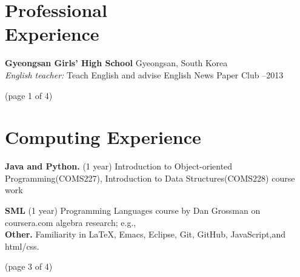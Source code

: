 \documentclass[margin,line]{resume}
\begin{document}
\begin{resume}
    
    \section{\mysidestyle Professional\\Experience}
    \textbf{Gyeongsan Girls' High School} \hfill \nosmall Gyeongsan, South Korea \\
    \textsl{English teacher:} \nosmall Teach English and advise English News Paper Club  \hfill {}--2013 \\
    


\vspace{-1cm}

\begin{center}
\hfill (page 1 of 4)
\end{center}
\newpage

    \section{\mysidestyle Computing Experience} 

    \renewcommand{\mytab}{}

    \textbf{Java and Python.} (1 year) Introduction to Object-oriented Programming(COMS227), Introduction to Data Structures(COMS228) course work
   
    \vspace{-2mm}
    \textbf{SML} (1 year) Programming Languages course by Dan Grossman on coursera.com
    algebra research; e.g.,\\

    \vspace{-2mm}
    \textbf{Other.} Familiarity in \LaTeX, Emacs, Eclipse, Git, GitHub, JavaScript,and html/css.\\

\begin{center}
\vskip-8mm
\hfill (page 3 of 4)
\end{center}

\newpage

\vskip2cm


\end{resume}
\end{document}
